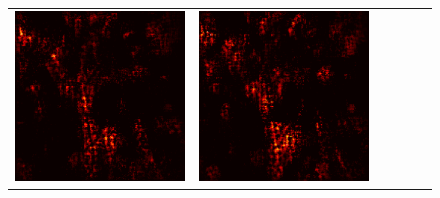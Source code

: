 \documentclass[preprint,12pt]{elsarticle}
\begin{document}
\begin{figure}[p]
\begin{tabular}{cccccc}
  \includegraphics[scale=\scale]{../visualizations/examples/imagenette/cnn/active_saliency_map/6.png} & 
  \includegraphics[scale=\scale]{../visualizations/examples/imagenette/cnn/inactive_saliency_map/6.png} \\
  

\end{tabular}
\end{figure}
\end{document}

